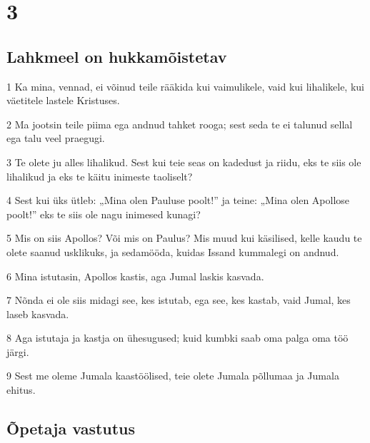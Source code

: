 \chapter{3}

\section*{Lahkmeel on hukkamõistetav}

\par 1 Ka mina, vennad, ei võinud teile rääkida kui vaimulikele, vaid kui lihalikele, kui väetitele lastele Kristuses.
\par 2 Ma jootsin teile piima ega andnud tahket rooga; sest seda te ei talunud sellal ega talu veel praegugi.
\par 3 Te olete ju alles lihalikud. Sest kui teie seas on kadedust ja riidu, eks te siis ole lihalikud ja eks te käitu inimeste taoliselt?
\par 4 Sest kui üks ütleb: „Mina olen Pauluse poolt!” ja teine: „Mina olen Apollose poolt!” eks te siis ole nagu inimesed kunagi?
\par 5 Mis on siis Apollos? Või mis on Paulus? Mis muud kui käsilised, kelle kaudu te olete saanud usklikuks, ja sedamööda, kuidas Issand kummalegi on andnud.
\par 6 Mina istutasin, Apollos kastis, aga Jumal laskis kasvada.
\par 7 Nõnda ei ole siis midagi see, kes istutab, ega see, kes kastab, vaid Jumal, kes laseb kasvada.
\par 8 Aga istutaja ja kastja on ühesugused; kuid kumbki saab oma palga oma töö järgi.
\par 9 Sest me oleme Jumala kaastöölised, teie olete Jumala põllumaa ja Jumala ehitus.

\section*{Õpetaja vastutus}

